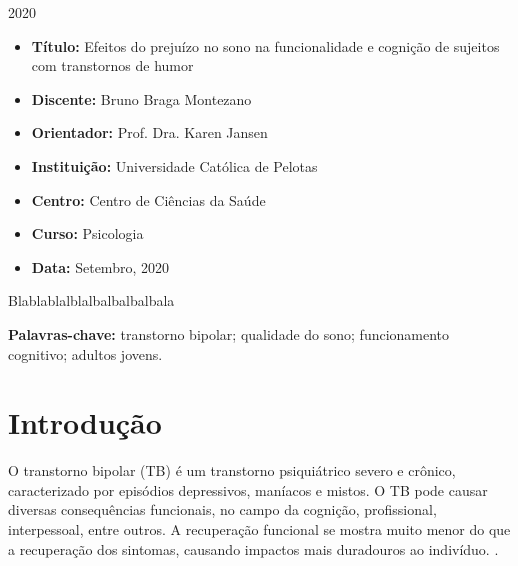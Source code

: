 \documentclass[chapter=TITLE,oneside,12pt,a4paper,english,brazil]{abntex2} %
\renewcommand{\ABNTEXchapterfont}{\normalfont\fontseries{b}\selectfont}
\renewcommand{\imprimircapa}{%
    \begin{capa}%
        \center
        \ABNTEXchapterfont\Large\imprimirinstituicao

        \vspace*{1cm}

        {\ABNTEXchapterfont\Large\imprimirautor}

        \vfill
        \begin{center}
            \ABNTEXchapterfont\bfseries\LARGE\imprimirtitulo
        \end{center}
        \vfill

        \large\imprimirlocal

        \large{2020}

        \vspace*{1cm}
    \end{capa}
}
\begin{document}
\imprimircapa

\imprimirfolhaderosto

\label{sec:identificacao}

\begin{itemize}
    \item \textbf{Título:} Efeitos do prejuízo no sono na funcionalidade
    e cognição de sujeitos com transtornos de humor
    \item \textbf{Discente:} Bruno Braga Montezano
    \item \textbf{Orientador:} Prof. Dra. Karen Jansen
    \item \textbf{Instituição:} Universidade Católica de Pelotas
    \item \textbf{Centro:} Centro de Ciências da Saúde
    \item \textbf{Curso:} Psicologia
    \item \textbf{Data:} Setembro, 2020
\end{itemize}

\newpage
\begin{KeepFromToc}
\tableofcontents
\end{KeepFromToc}
\newpage

\begin{resumo}

    Blablablalblalbalbalbalbala

    \vspace{\onelineskip}

    \textbf{Palavras-chave:} transtorno bipolar; qualidade do sono;
    funcionamento cognitivo; adultos jovens.
\end{resumo}

\textual

\begingroup
\renewcommand{\cleardoublepage}{}
\renewcommand{\clearpage}{}

\chapter{Introdução}\label{sec:introducao}

    O transtorno bipolar (TB) é um transtorno psiquiátrico severo e crônico,
    caracterizado por episódios depressivos, maníacos e mistos.
    O TB pode causar diversas consequências funcionais, no campo da cognição,
    profissional, interpessoal, entre outros.
    A recuperação funcional se mostra muito menor do que a recuperação dos
    sintomas, causando impactos mais duradouros ao indivíduo.
    \parencite{american_psychiatric_association_diagnostic_2013}.
\end{document}
